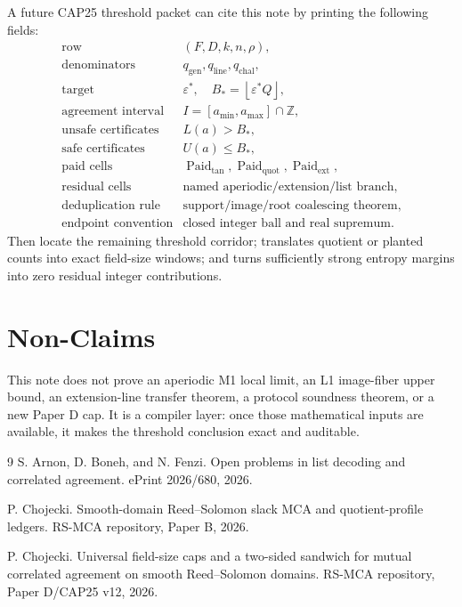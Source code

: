 \documentclass[11pt]{article}
\theoremstyle{definition}
\theoremstyle{remark}
\newcommand{\Paid}{\operatorname{Paid}}
\newcommand{\floor}[1]{\left\lfloor #1\right\rfloor}
\begin{document}
A future CAP25 threshold packet can cite this note by printing the following
fields:
\[
\begin{array}{ll}
\text{row} & (F,D,k,n,\rho),\\
\text{denominators} & q_{\mathrm{gen}},q_{\mathrm{line}},q_{\mathrm{chal}},\\
\text{target} & \varepsilon^*,\quad B_*=\floor{\varepsilon^* Q},\\
\text{agreement interval} & I=[a_{\min},a_{\max}]\cap\mathbb Z,\\
\text{unsafe certificates} & L(a)>B_*,\\
\text{safe certificates} & U(a)\le B_*,\\
\text{paid cells} & \Paid_{\tan},\Paid_{\mathrm{quot}},\Paid_{\mathrm{ext}},\\
\text{residual cells} & \text{named aperiodic/extension/list branch},\\
\text{deduplication rule} & \text{support/image/root coalescing theorem},\\
\text{endpoint convention} & \text{closed integer ball and real supremum}.
\end{array}
\]
Then  locate the remaining threshold
corridor;  translates quotient or planted counts into exact
field-size windows; and  turns sufficiently strong
entropy margins into zero residual integer contributions.

\section{Non-Claims}

This note does not prove an aperiodic M1 local limit, an L1 image-fiber upper
bound, an extension-line transfer theorem, a protocol soundness theorem, or a
new Paper D cap.  It is a compiler layer: once those mathematical inputs are
available, it makes the threshold conclusion exact and auditable.

\begin{thebibliography}{9}
S. Arnon, D. Boneh, and N. Fenzi.
\newblock Open problems in list decoding and correlated agreement.
\newblock ePrint 2026/680, 2026.

P. Chojecki.
\newblock Smooth-domain Reed--Solomon slack MCA and quotient-profile ledgers.
\newblock RS-MCA repository, Paper B, 2026.

P. Chojecki.
\newblock Universal field-size caps and a two-sided sandwich for mutual
correlated agreement on smooth Reed--Solomon domains.
\newblock RS-MCA repository, Paper D/CAP25 v12, 2026.
\end{thebibliography}
\end{document}
